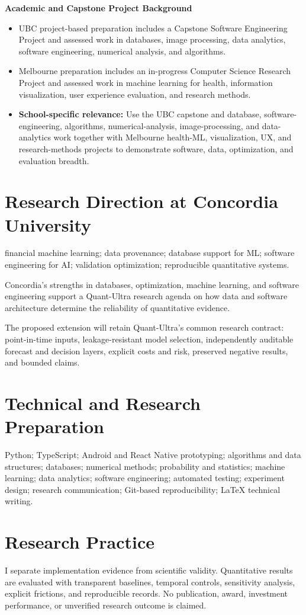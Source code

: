 \documentclass[11pt]{article}
\begin{document}
\textbf{Academic and Capstone Project Background}
\begin{itemize}
\item UBC project-based preparation includes a Capstone Software Engineering Project and assessed work in databases, image processing, data analytics, software engineering, numerical analysis, and algorithms.
\item Melbourne preparation includes an in-progress Computer Science Research Project and assessed work in machine learning for health, information visualization, user experience evaluation, and research methods.
\item \textbf{School-specific relevance:} Use the UBC capstone and database, software-engineering, algorithms, numerical-analysis, image-processing, and data-analytics work together with Melbourne health-ML, visualization, UX, and research-methods projects to demonstrate software, data, optimization, and evaluation breadth.
\end{itemize}

\section*{Research Direction at Concordia University}
financial machine learning; data provenance; database support for ML; software engineering for AI; validation optimization; reproducible quantitative systems.

Concordia's strengths in databases, optimization, machine learning, and software engineering support a Quant-Ultra research agenda on how data and software architecture determine the reliability of quantitative evidence.

The proposed extension will retain Quant-Ultra's common research contract: point-in-time inputs, leakage-resistant model selection, independently auditable forecast and decision layers, explicit costs and risk, preserved negative results, and bounded claims.

\section*{Technical and Research Preparation}
Python; TypeScript; Android and React Native prototyping; algorithms and data structures; databases; numerical methods; probability and statistics; machine learning; data analytics; software engineering; automated testing; experiment design; research communication; Git-based reproducibility; LaTeX technical writing.

\section*{Research Practice}
I separate implementation evidence from scientific validity. Quantitative results are evaluated with transparent baselines, temporal controls, sensitivity analysis, explicit frictions, and reproducible records. No publication, award, investment performance, or unverified research outcome is claimed.
\end{document}
